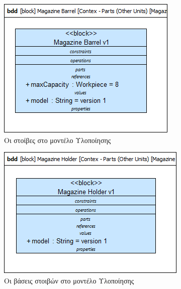 \documentclass[a4paper,12pt,twoside]{report}
\begin{document}
{\begin{appendices}
				\begin{figure}[hp]
					\centering
					\includegraphics[scale=0.50]{DesignModel_Contex-Parts(OtherUnits)[MagazineBarrel].png}
					\caption{Οι στοίβες στο μοντέλο Υλοποίησης}
					\label{φωτ:Οι στοίβες στο μοντέλο Υλοποίησης}
				\end{figure}
				
				\begin{figure}[hp]
					\centering
					\includegraphics[scale=0.50]{DesignModel_Contex-Parts(OtherUnits)[MagazineHolder].png}
					\caption{Οι βάσεις στοιβών στο μοντέλο Υλοποίησης}
					\label{φωτ:Οι βάσεις στοιβών στο μοντέλο Υλοποίησης}
				\end{figure}
				

\end{appendices}}
\end{document}
